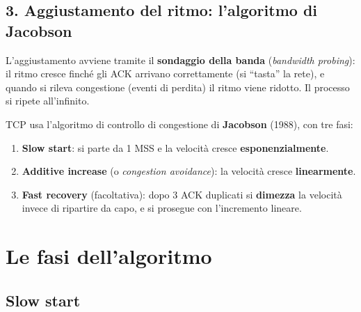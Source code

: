 \subsection{3. Aggiustamento del ritmo: l'algoritmo di Jacobson}

L'aggiustamento avviene tramite il \textbf{sondaggio della banda} (\emph{bandwidth probing}): il ritmo
cresce finché gli ACK arrivano correttamente (si ``tasta'' la rete), e quando si rileva congestione
(eventi di perdita) il ritmo viene ridotto. Il processo si ripete all'infinito.

TCP usa l'algoritmo di controllo di congestione di \textbf{Jacobson} (1988), con tre fasi:

\begin{enumerate}
    \item \textbf{Slow start}: si parte da 1 MSS e la velocità cresce \textbf{esponenzialmente}.
    \item \textbf{Additive increase} (o \emph{congestion avoidance}): la velocità cresce \textbf{linearmente}.
    \item \textbf{Fast recovery} (facoltativa): dopo 3 ACK duplicati si \textbf{dimezza} la velocità invece di
          ripartire da capo, e si prosegue con l'incremento lineare.
\end{enumerate}

\section{Le fasi dell'algoritmo}

\subsection{Slow start}


